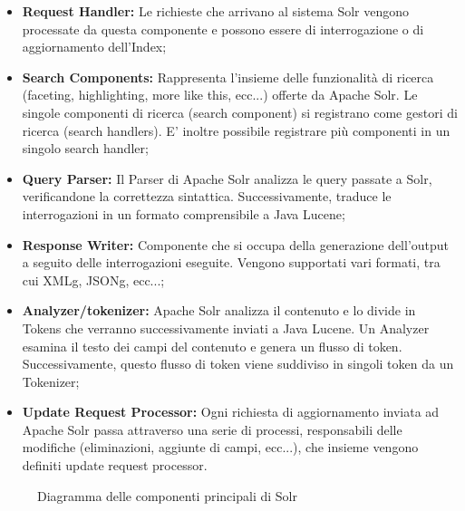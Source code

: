 			\begin{itemize}
				\label{solr:request_handler}
				\item {\textbf{Request Handler:} Le richieste che arrivano al sistema \gls{Solr} vengono processate da questa componente e possono essere di interrogazione o di aggiornamento dell'\gls{Index}; }
				
				\item{\textbf{Search Components:} Rappresenta l'insieme delle funzionalità di ricerca (faceting, highlighting, more like this, ecc...) offerte da Apache Solr. Le singole componenti di ricerca (search component) si registrano come gestori di ricerca (search handlers). E' inoltre possibile registrare più componenti in un singolo search handler;}
				
				\label{solr:query_parser}
				\item{\textbf{Query Parser:} Il \gls{Parser} di Apache Solr analizza le query passate a \gls{Solr}, verificandone la correttezza sintattica. Successivamente, traduce le interrogazioni in un formato comprensibile a \gls{Java Lucene};}
				
				\item{\textbf{Response Writer:} Componente che si occupa della generazione dell'output a seguito delle interrogazioni eseguite. Vengono supportati vari formati, tra cui \gls{XMLg}, \gls{JSONg}, ecc...;}
				
				\label{solr:analyzer_tokenizer}
				\item{\textbf{Analyzer/tokenizer:} Apache Solr analizza il contenuto e lo divide in \glspl{Token} che verranno successivamente inviati a \gls{Java Lucene}. Un Analyzer esamina il testo dei campi del contenuto e genera un flusso di token. Successivamente, questo flusso di token viene suddiviso in singoli token da un \gls{Tokenizer};}
				
				\item{\textbf{Update Request Processor:} Ogni richiesta di aggiornamento inviata ad Apache Solr passa attraverso una serie di processi, responsabili delle modifiche (eliminazioni, aggiunte di campi, ecc...), che insieme vengono definiti update request processor.}
				
			\end{itemize}
			
			\begin{figure}[p]
				\caption{Diagramma delle componenti principali di Solr}
			\end{figure}
			
